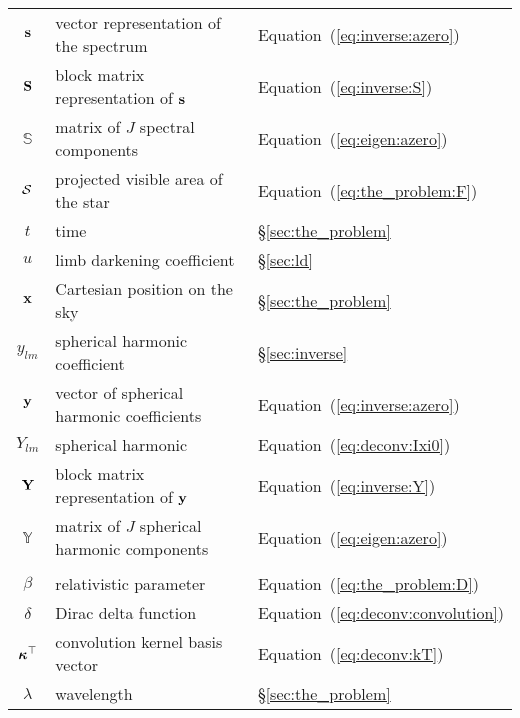 \documentclass[modern]{aastex62}
\begin{document}
\begin{center}
\begin{longtable}{cll}
    ${\mathbf{s}}$               & vector representation of the spectrum                 & Equation~(\ref{eq:inverse:azero})\\
    ${\mathbf{S}}$               & block matrix representation of ${\mathbf{s}}$             & Equation~(\ref{eq:inverse:S})\\
    $\boldsymbol{\mathbb{S}}$& matrix of $J$ spectral components                     & Equation~(\ref{eq:eigen:azero})\\
    $\mathcal{S}$                  & projected visible area of the star                    & Equation~(\ref{eq:the_problem:F})\\
    $t$                      & time                                                  & \S\ref{sec:the_problem}\\
    $u$                      & limb darkening coefficient                            & \S\ref{sec:ld}\\
    ${\mathbf{x}}$                     & Cartesian position on the sky                         & \S\ref{sec:the_problem}\\
    $y_{lm}$                 & spherical harmonic coefficient                        & \S\ref{sec:inverse}\\
    ${\mathbf{y}}$               & vector of spherical harmonic coefficients             & Equation~(\ref{eq:inverse:azero})\\
    $Y_{lm}$                 & spherical harmonic                                    & Equation~(\ref{eq:deconv:Ixi0})\\
    ${\mathbf{Y}}$               & block matrix representation of ${\mathbf{y}}$             & Equation~(\ref{eq:inverse:Y})\\
    $\boldsymbol{\mathbb{Y}}$& matrix of $J$ spherical harmonic components           & Equation~(\ref{eq:eigen:azero})\\
    \pagebreak
    \midrule
    \multicolumn{3}{c}{\emph{Variables (Greek)}}\\
    \midrule
    $\beta$                  & relativistic parameter                                & Equation~(\ref{eq:the_problem:D})\\
    $\delta$                 & Dirac delta function                                  & Equation~(\ref{eq:deconv:convolution})\\
    $\boldsymbol{\kappa}^\top$                    & convolution kernel basis vector                       & Equation~(\ref{eq:deconv:kT})\\
    $\lambda$                & wavelength                                            & \S\ref{sec:the_problem}\\

\end{longtable}
\end{center}
\end{document}
